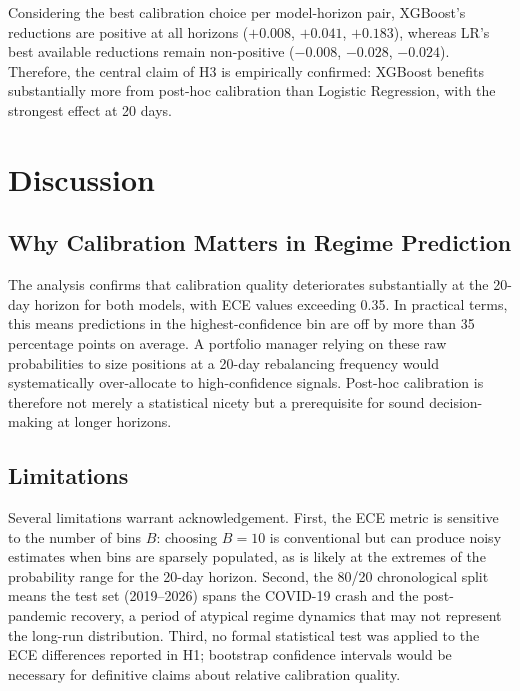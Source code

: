 \documentclass[12pt]{article}
\begin{document}
Considering the best calibration choice per model-horizon pair,
XGBoost's reductions are positive at all horizons
($+0.008$, $+0.041$, $+0.183$), whereas LR's best available reductions remain
non-positive ($-0.008$, $-0.028$, $-0.024$).
Therefore, the central claim of H3 is empirically confirmed: XGBoost benefits
substantially more from post-hoc calibration than Logistic Regression,
with the strongest effect at 20 days.

\section{Discussion}

\subsection{Why Calibration Matters in Regime Prediction}

The analysis confirms that calibration quality deteriorates substantially at the
20-day horizon for both models, with ECE values exceeding 0.35.
In practical terms, this means predictions in the highest-confidence bin are off
by more than 35 percentage points on average.
A portfolio manager relying on these raw probabilities to size positions at a
20-day rebalancing frequency would systematically over-allocate to high-confidence
signals.
Post-hoc calibration is therefore not merely a statistical nicety but a prerequisite
for sound decision-making at longer horizons.

\subsection{Limitations}

Several limitations warrant acknowledgement.
First, the ECE metric is sensitive to the number of bins $B$: choosing $B=10$
is conventional but can produce noisy estimates when bins are sparsely populated,
as is likely at the extremes of the probability range for the 20-day horizon.
Second, the 80/20 chronological split means the test set (2019--2026) spans
the COVID-19 crash and the post-pandemic recovery, a period of atypical regime
dynamics that may not represent the long-run distribution.
Third, no formal statistical test was applied to the ECE differences reported
in H1; bootstrap confidence intervals would be necessary for definitive claims
about relative calibration quality.
\end{document}
